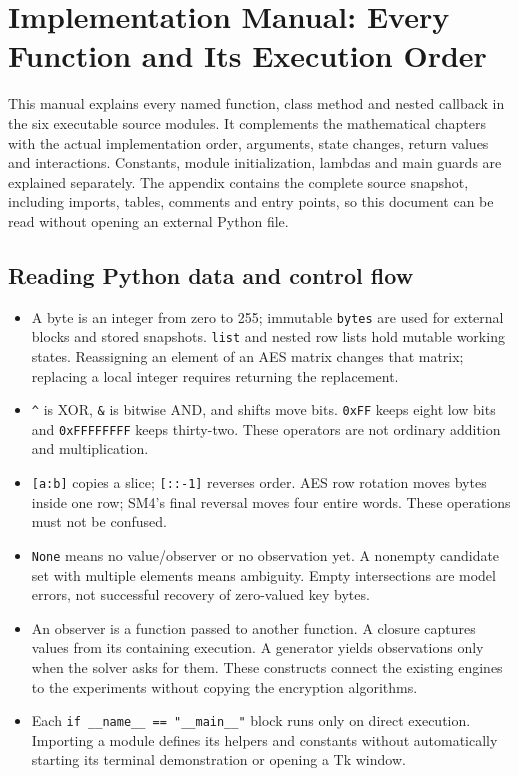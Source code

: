 \chapter{Implementation Manual: Every Function and Its Execution Order}
\label{chap:function-manual}
This manual explains every named function, class method and nested callback in the six executable source modules. It complements the mathematical chapters with the actual implementation order, arguments, state changes, return values and interactions. Constants, module initialization, lambdas and main guards are explained separately. The appendix contains the complete source snapshot, including imports, tables, comments and entry points, so this document can be read without opening an external Python file.

\section{Reading Python data and control flow}
\begin{itemize}
\item A byte is an integer from zero to 255; immutable \texttt{bytes} are used for external blocks and stored snapshots. \texttt{list} and nested row lists hold mutable working states. Reassigning an element of an AES matrix changes that matrix; replacing a local integer requires returning the replacement.
\item \texttt{\^{}} is XOR, \texttt{\&} is bitwise AND, and shifts move bits. \texttt{0xFF} keeps eight low bits and \texttt{0xFFFFFFFF} keeps thirty-two. These operators are not ordinary addition and multiplication.
\item \texttt{[a:b]} copies a slice; \texttt{[::-1]} reverses order. AES row rotation moves bytes inside one row; SM4's final reversal moves four entire words. These operations must not be confused.
\item \texttt{None} means no value/observer or no observation yet. A nonempty candidate set with multiple elements means ambiguity. Empty intersections are model errors, not successful recovery of zero-valued key bytes.
\item An observer is a function passed to another function. A closure captures values from its containing execution. A generator yields observations only when the solver asks for them. These constructs connect the existing engines to the experiments without copying the encryption algorithms.
\item Each \texttt{if \_\allowbreak{}\_\allowbreak{}name\_\allowbreak{}\_\allowbreak{} == "\_\allowbreak{}\_\allowbreak{}main\_\allowbreak{}\_\allowbreak{}"} block runs only on direct execution. Importing a module defines its helpers and constants without automatically starting its terminal demonstration or opening a Tk window.
\end{itemize}

